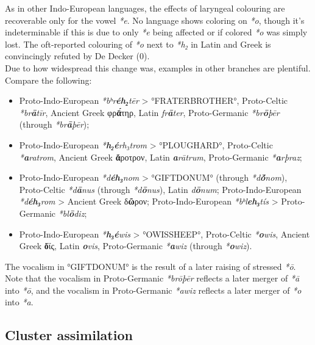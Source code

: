 \documentclass[svgnames,x11names,b5paper]{book}
\begin{document}
            As in other Indo-European languages, the effects of laryngeal colouring are recoverable only for the vowel \textit{*e}. No language shows coloring on \textit{*o}, though it's indeterminable if this is due to only \textit{*e} being affected or if colored \textit{*o} was simply lost. The oft-reported colouring of \textit{*o} next to \textit{*h₂} in Latin and Greek is convincingly refuted by De Decker (0).\\
Due to how widespread this change was, examples in other branches are plentiful. Compare the following:
\begin{itemize}
\item  Proto-Indo-European \textit{*bʰr\textbf{éh₂}tēr} > °FRATERBROTHER°, Proto-Celtic \textit{*br\textbf{ā}tīr}, Ancient Greek φρ\textbf{ᾱ́}τηρ, Latin \textit{fr\textbf{ā}ter}, Proto-Germanic \textit{*br\textbf{ō}þēr} (through \textit{*br\textbf{ā}þēr});\\
\item  Proto-Indo-European \textit{*\textbf{h₂é}rh₃trom} > °PLOUGHARD°, Proto-Celtic \textit{*\textbf{a}ratrom}, Ancient Greek \textbf{ἄ}ροτρον, Latin \textit{\textbf{a}rātrum}, Proto-Germanic \textit{*\textbf{a}rþraz};\\
\item  Proto-Indo-European \textit{*d\textbf{éh₃}nom} > °GIFTDONUM° (through \textit{*d\textbf{ṓ}nom}), Proto-Celtic \textit{*d\textbf{ā}nus} (through \textit{*d\textbf{ō}nus}), Latin \textit{d\textbf{ō}num}; Proto-Indo-European \textit{*d\textbf{éh₃}rom} > Ancient Greek δ\textbf{ῶ}ρον; Proto-Indo-European \textit{*bʰl\textbf{eh₃}tís} > Proto-Germanic \textit{*bl\textbf{ō}diz};\\
\item  Proto-Indo-European \textit{*\textbf{h₃é}wis} > °OWISSHEEP°, Proto-Celtic \textit{*\textbf{o}wis}, Ancient Greek \textbf{ὄ}ϊς, Latin \textit{\textbf{o}vis}, Proto-Germanic \textit{*\textbf{a}wiz} (through \textit{*\textbf{o}wiz}).\\
\end{itemize}
The vocalism in °GIFTDONUM° is the result of a later raising of stressed \textit{*ō}. Note that the vocalism in Proto-Germanic \textit{*brōþēr} reflects a later merger of \textit{*ā} into \textit{*ō}, and the vocalism in Proto-Germanic \textit{*awiz} reflects a later merger of \textit{*o} into \textit{*a}.

            \subsection{Cluster assimilation}
        
\end{document}
